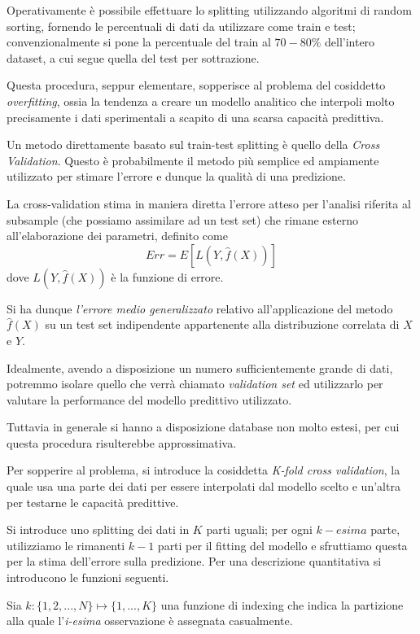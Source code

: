\documentclass[12pt,openright,twoside,a4paper]{book}
\begin{document}
Operativamente è possibile effettuare lo splitting utilizzando algoritmi di random sorting, fornendo le percentuali di dati da utilizzare come train e test; convenzionalmente si pone la percentuale del train al $70-80\%$ dell'intero dataset, a cui segue quella del test per sottrazione.

Questa procedura, seppur elementare, sopperisce al problema del cosiddetto \textit{overfitting}, ossia la tendenza a creare un modello analitico che interpoli molto precisamente i dati sperimentali a scapito di una scarsa capacità predittiva.

Un metodo direttamente basato sul train-test splitting è quello della \textit{Cross Validation}.
Questo è probabilmente il metodo più semplice ed ampiamente utilizzato per stimare l'errore e dunque la qualità di una predizione.

La cross-validation stima in maniera diretta l'errore atteso per l'analisi riferita al subsample (che possiamo assimilare ad un test set) che rimane esterno all'elaborazione dei parametri, definito come
\begin{equation}
Err=E[L(Y,\hat{f}(X))]
\end{equation}
dove $L(Y,\hat{f}(X))$ è la funzione di errore.

Si ha dunque \textit{l'errore medio generalizzato} relativo all'applicazione del metodo $\hat{f}(X)$ su un test set indipendente appartenente alla distribuzione correlata di $X$ e $Y$.

Idealmente, avendo a disposizione un numero sufficientemente grande di dati, potremmo isolare quello che verrà chiamato \textit{validation set} ed utilizzarlo per valutare la performance del modello predittivo utilizzato.

Tuttavia in generale si hanno a disposizione database non molto estesi, per cui questa procedura risulterebbe approssimativa.

Per sopperire al problema, si introduce la cosiddetta \textit{K-fold cross validation}, la quale usa una parte dei dati per essere interpolati dal modello scelto e un'altra per testarne le capacità predittive.

Si introduce uno splitting dei dati in $K$ parti uguali; per ogni $k-esima$ parte, utilizziamo le rimanenti $k-1$ parti per il fitting del modello e sfruttiamo questa per la stima dell'errore sulla predizione.
Per una descrizione quantitativa si introducono le funzioni seguenti.

Sia $k:\{1,2,...,N\}\longmapsto\{1,...,K\}$ una funzione di indexing che indica la partizione alla quale l'\textit{i-esima} osservazione è assegnata casualmente.
\end{document}
